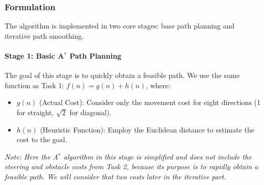 \documentclass[aps,letterpaper,10pt]{revtex4}
\begin{document}
\subsubsection{Formulation}
The algorithm is implemented in two core stages: base path planning and iterative path smoothing.

\paragraph{Stage 1: Basic A$^*$ Path Planning}
The goal of this stage is to quickly obtain a feasible path. We use the same function as Task 1: $f(n) = g(n) + h(n)$, where:
\begin{itemize}
    \item $g(n)$ (Actual Cost): Consider only the movement cost for eight directions (1 for straight, $\sqrt{2}$ for diagonal).
    \item $h(n)$ (Heuristic Function): Employ the Euclidean distance to estimate the cost to the goal.
\end{itemize}
\textit{Note: Here the A$^*$ algorithm in this stage is simplified and does not include the steering and obstacle costs from Task 2, because its purpose is to rapidly obtain a feasible path. We will consider that two costs later in the iterative part.}
\end{document}
